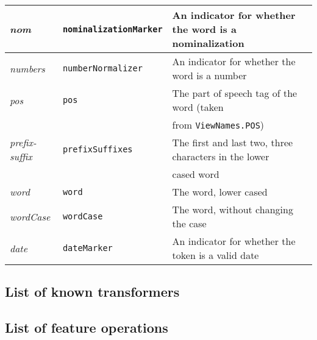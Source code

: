 \documentclass[11pt]{article}
\begin{document}
{\begin{center}
\begin{tabular}{lll}
\hline
 \emph{nom}                 &  \texttt{nominalizationMarker}               &  An indicator for whether the word is a nominalization                                                       \\
\hline
 \emph{numbers}             &  \texttt{numberNormalizer}                   &  An indicator for whether the word is a number                                                               \\
\hline
 \emph{pos}                 &  \texttt{pos}                                &  The part of speech tag of the word (taken                                                                   \\
                            &                                              &  from \texttt{ViewNames.POS})                                                                                \\
\hline
 \emph{prefix-suffix}       &  \texttt{prefixSuffixes}                     &  The first and last two, three characters in the lower                                                       \\
                            &                                              &  cased word                                                                                                  \\
\hline
 \emph{word}                &  \texttt{word}                               &  The word, lower cased                                                                                       \\
\hline
 \emph{wordCase}            &  \texttt{wordCase}                           &  The word, without changing the case                                                                         \\
\hline
 \emph{date}                &  \texttt{dateMarker}                         &  An indicator for whether the token is a valid date                                                          \\
\hline
\end{tabular}
\end{center}


}
\subsection{List of known transformers}
\label{sec-4-4}
\subsection{List of feature operations}
\label{sec-4-5}
\end{document}
